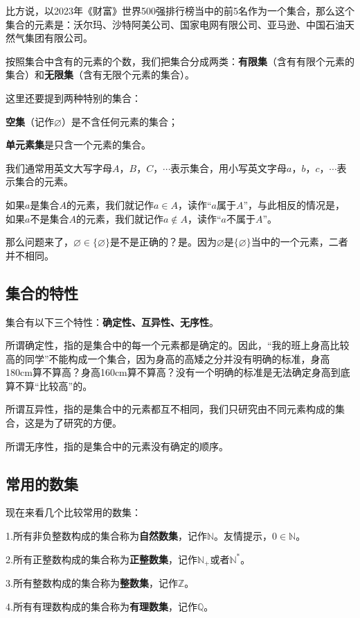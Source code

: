 \documentclass[lang=cn,math=cm,chinesefont=nofont,11pt,scheme=chinese]{elegantbook}
\begin{document}
比方说，以2023年《财富》世界500强排行榜当中的前5名作为一个集合，那么这个集合的元素是：沃尔玛、沙特阿美公司、国家电网有限公司、亚马逊、中国石油天然气集团有限公司。

按照集合中含有的元素的个数，我们把集合分成两类：\textbf{有限集}（含有有限个元素的集合）和\textbf{无限集}（含有无限个元素的集合）。

这里还要提到两种特别的集合：

\textbf{空集}（记作$\varnothing$）是不含任何元素的集合；

\textbf{单元素集}是只含一个元素的集合。

我们通常用英文大写字母$A$，$B$，$C$，$\cdots$表示集合，用小写英文字母$a$，$b$，$c$，$\cdots$表示集合的元素。

如果$a$是集合$A$的元素，我们就记作$a\in A$，读作“$a$属于$A$”，与此相反的情况是，如果$a$不是集合$A$的元素，我们就记作$a\notin A$，读作“$a$不属于$A$”。

那么问题来了，$\varnothing \in \{\varnothing\}$是不是正确的？是。因为$\varnothing$是$\{\varnothing\}$当中的一个元素，二者并不相同。

\subsection{集合的特性}
集合有以下三个特性：\textbf{确定性、互异性、无序性}。

所谓确定性，指的是集合中的每一个元素都是确定的。因此，“我的班上身高比较高的同学”不能构成一个集合，因为身高的高矮之分并没有明确的标准，身高180cm算不算高？身高160cm算不算高？没有一个明确的标准是无法确定身高到底算不算“比较高”的。

所谓互异性，指的是集合中的元素都互不相同，我们只研究由不同元素构成的集合，这是为了研究的方便。

所谓无序性，指的是集合中的元素没有确定的顺序。

\subsection{常用的数集}
现在来看几个比较常用的数集：

1.所有非负整数构成的集合称为\textbf{自然数集}，记作$\mathbb{N}$。友情提示，$0\in \mathbb{N}$。

2.所有正整数构成的集合称为\textbf{正整数集}，记作$\mathbb{N}_+$或者$\mathbb{N}^*$。

3.所有整数构成的集合称为\textbf{整数集}，记作$\mathbb{Z}$。

4.所有有理数构成的集合称为\textbf{有理数集}，记作$\mathbb{Q}$。
\end{document}

